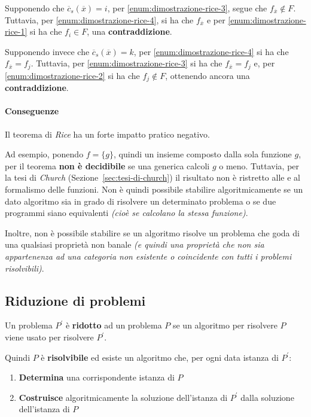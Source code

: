 \documentclass[italian, 10pt]{article}
\begin{document}
\bigskip
Supponendo che \(\overline{c}_s (\overline{x}) = i\), per \ref{enum:dimostrazione-rice-3}, segue che \(f_{\overline{x}} \notin F\).
Tuttavia, per \ref{enum:dimostrazione-rice-4}, si ha che \(f_{\overline{x}}\) e per \ref{enum:dimostrazione-rice-1} si ha che \(f_i \in F\), una \textbf{contraddizione}.

Supponendo invece che \(\overline{c}_s (\overline{x}) = k\), per \ref{enum:dimostrazione-rice-4} si ha che \(f_{\overline{x}} = f_j\).
Tuttavia, per \ref{enum:dimostrazione-rice-3} si ha che \(f_{\overline{x}} = f_j\) e, per \ref{enum:dimostrazione-rice-2} si ha che \(f_j \notin F\), ottenendo ancora una \textbf{contraddizione}.

\paragraph{Conseguenze}

Il teorema di \textit{Rice} ha un forte impatto pratico negativo.

Ad esempio, ponendo \(f = \{g\}\), quindi un insieme composto dalla sola funzione \(g\), per il teorema \textbf{non è decidibile} se una generica \TM calcoli \(g\) o meno.
Tuttavia, per la tesi di \textit{Church} (Sezione~\ref{sec:tesi-di-church}) il risultato non è ristretto alle \TM e al formalismo delle funzioni.
Non è quindi possibile stabilire algoritmicamente se un dato algoritmo sia in grado di risolvere un determinato problema o se due programmi siano equivalenti \textit{(cioè se calcolano la stessa funzione)}.

Inoltre, non è possibile stabilire se un algoritmo risolve un problema che goda di una qualsiasi proprietà non banale \textit{(e quindi una proprietà che non sia appartenenza ad una categoria non esistente o coincidente con tutti i problemi risolvibili)}.

\subsection{Riduzione di problemi}

Un problema \(P^\prime\) è \textbf{ridotto} ad un problema \(P\) se un algoritmo per risolvere \(P\) viene usato per risolvere \(P^\prime\).

Quindi \(P\) è \textbf{risolvibile} ed esiste un algoritmo che, per ogni data istanza di \(P^\prime\):

\begin{enumerate}
  \item \textbf{Determina} una corrispondente istanza di \(P\)
  \item \textbf{Costruisce} algoritmicamente la soluzione dell'istanza di \(P^\prime\) dalla soluzione dell'istanza di \(P\)
\end{enumerate}
\end{document}
